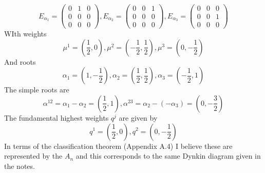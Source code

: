 \documentclass[12pt]{article}
\begin{document}
$$ E_{\alpha_1} = \begin{pmatrix}
  0&1&0 \\ 0&0&0 \\ 0&0&0 
\end{pmatrix}, E_{\alpha_2} = \begin{pmatrix}
  0&0&1 \\ 0&0&0 \\ 0&0&0 
\end{pmatrix}, E_{\alpha_3} = \begin{pmatrix}
  0&0&0 \\ 0&0&1 \\ 0&0&0 
\end{pmatrix} $$
WIth weights 
$$ \mu^1 = (\frac{1}{2}, 0), \mu^2 = (- \frac{1}{2}, \frac{1}{2} ), \mu^3 = (0, - \frac{1}{2} ) $$
And roots 
$$ \alpha_1 = (1, - \frac{1}{2} ), \alpha_2 = (\frac{1}{2}, \frac{1}{2} ), \alpha_3 = (- \frac{1}{2}, 1) $$
The simple roots are 
$$ \alpha^{12} = \alpha_1 - \alpha_2 = (\frac{1}{2}, 1), \alpha^{23} = \alpha_2 - (- \alpha_3) = (0, - \frac{3}{2} ) $$
The fundamental highest weights $q^j$ are given by 
$$ q^1 = (\frac{1}{2}, 0), q^2 = (0, - \frac{1}{2} ) $$
In terms of the classification theorem (Appendix A.4) I believe these are represented by the $A_n$ and this corresponds to the same Dynkin diagram given in the notes. 
\end{document}

